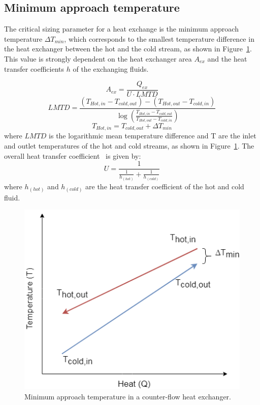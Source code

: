 \documentclass{article}
\begin{document}
\subsection{Minimum approach temperature}\label{ss:dtmin}
The critical sizing parameter for a heat exchange is the minimum approach temperature $\Delta T_{min}$, which corresponds to the smallest temperature difference in the heat exchanger between the hot and the cold stream, as shown in Figure~\ref{fig:dtmin}. This value is strongly dependent on the heat exchanger area $A_{ex}$ and the heat transfer coefficients $h$ of the exchanging fluids. 

\begin{equation}\label{eq:HEX_area}
A_{ex} = \frac{Q_{ex}}{U \cdot LMTD}
\end{equation}
\begin{equation}\label{eq:LMTD}
LMTD= \frac{(T_{Hot,in } - T_{cold,out }) - (T_{Hot,out } - T_{cold,in }) }{ \log{ (\frac{T_{Hot,in } - T_{cold,out }}{T_{Hot,out } - T_{cold,in }} ) }}
\end{equation}
\begin{equation}
	T_{Hot,in } = T_{cold,out} + \Delta T_{min}
\end{equation}
where  $LMTD$ is the logarithmic mean temperature difference and T are the inlet and outlet temperatures of the hot and cold streams, as shown in Figure~\ref{fig:dtmin}. The overall heat transfer coefficient~\cite{huExtremumSeekingControl2015} is given by:
\begin{equation}\label{eq:alpha}
U= \frac{1}{ \frac{1}{h_{(hot)} } + \frac{1}{h_{(cold)}} }
\end{equation}
where $h_{(hot)}$ and $h_{(cold)}$ are the heat transfer coefficient of the hot and cold fluid.

\begin{figure}[htp]
	\centering
	\includegraphics[scale=0.5]{Images/dtmin.png}
	\caption{Minimum approach temperature in a counter-flow heat exchanger.}
	\label{fig:dtmin}
\end{figure}
\end{document}
